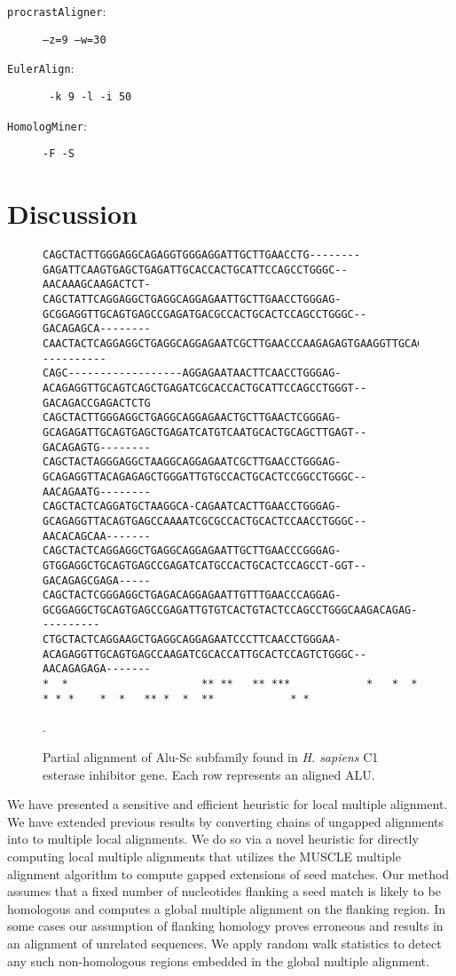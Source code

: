 \documentclass[twoside,11pt]{article}
\begin{document}
\begin{center}
\begin{description}
\item[\texttt{procrastAligner}:] \texttt{--z=9 --w=30}
\item[\texttt{EulerAlign}:]     \texttt{ -k 9 -l -i 50}
\item[\texttt{HomologMiner}:]    \texttt{-F -S}

\end{description}
\end{center}
\section{Discussion}

\begin{figure}[t]
\scriptsize
\begin{verbatim}
CAGCTACTTGGGAGGCAGAGGTGGGAGGATTGCTTGAACCTG--------GAGATTCAAGTGAGCTGAGATTGCACCACTGCATTCCAGCCTGGGC--AACAAAGCAAGACTCT-
CAGCTATTCAGGAGGCTGAGGCAGGAGAATTGCTTGAACCTGGGAG-GCGGAGGTTGCAGTGAGCCGAGATGACGCCACTGCACTCCAGCCTGGGC--GACAGAGCA--------
CAACTACTCAGGAGGCTGAGGCAGGAGAATCGCTTGAACCCAAGAGAGTGAAGGTTGCAGTGAGCTGAGATCATGCCACTTCACTCCAGCCTGAGTGAAACAGC-----------
CAGC------------------AGGAGAATAACTTCAACCTGGGAG-ACAGAGGTTGCAGTCAGCTGAGATCGCACCACTGCATTCCAGCCTGGGT--GACAGACCGAGACTCTG
CAGCTACTTGGGAGGCTGAGGCAGGAGAACTGCTTGAACTCGGGAG-GCAGAGATTGCAGTGAGCTGAGATCATGTCAATGCACTGCAGCTTGAGT--GACAGAGTG--------
CAGCTACTAGGGAGGCTAAGGCAGGAGAATCGCTTGAACCTGGGAG-GCAGAGGTTACAGAGAGCTGGGATTGTGCCACTGCACTCCGGCCTGGGC--AACAGAATG--------
CAGCTACTCAGGATGCTAAGGCA-CAGAATCACTTGAACCTGGGAG-GCAGAGGTTACAGTGAGCCAAAATCGCGCCACTGCACTCCAACCTGGGC--AACACAGCAA-------
CAGCTACTCAGGAGGCTGAGGCAGGAGAATTGCTTGAACCCGGGAG-GTGGAGGCTGCAGTGAGCCGAGATCATGCCACTGCACTCCAGCCT-GGT--GACAGAGCGAGA-----
CAGCTACTCGGGAGGCTGAGACAGGAGAATTGTTTGAACCCAGGAG-GCGGAGGCTGCAGTGAGCCGAGATTGTGTCACTGTACTCCAGCCTGGGCAAGACAGAG----------
CTGCTACTCAGGAAGCTGAGGCAGGAGAATCCCTTCAACCTGGGAA-ACAGAGGTTGCAGTGAGCCAAGATCGCACCATTGCACTCCAGTCTGGGC--AACAGAGAGA-------
*  *                     ** **   ** ***            *   *  * * * *    *  *   ** *  *  **            * *
\end{verbatim}
\vspace{-0.5cm}
\normalsize
\caption{Partial alignment of Alu-Sc subfamily found in \emph{H. sapiens} C1 esterase inhibitor gene. Each row represents an aligned ALU.}.
\label{fig-align}
\end{figure}
We have presented a sensitive and efficient heuristic for local multiple alignment.
We have extended previous results by converting chains of ungapped alignments into to multiple local alignments. We do so via a novel heuristic for directly computing local multiple alignments that utilizes the MUSCLE multiple alignment algorithm to compute gapped extensions of seed matches.  Our method assumes that a fixed number of nucleotides flanking a seed match is likely to be homologous and computes a global multiple alignment on the flanking region.  In some cases our assumption of flanking homology proves erroneous and results in an alignment of unrelated sequences.  We apply random walk statistics to detect any such non-homologous regions embedded in the global multiple alignment.
\end{document}

